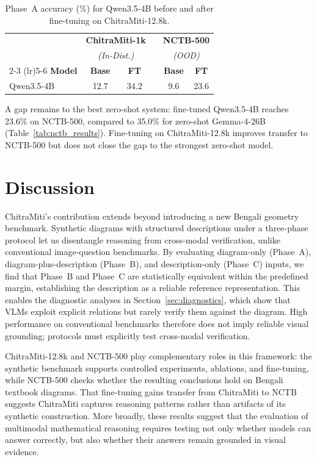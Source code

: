 \documentclass[11pt]{article}
\begin{document}
\begin{table}[t]
\centering
\small
\begin{tabular}{@{}l cc c cc@{}}
\toprule
& \multicolumn{2}{c}{\textbf{ChitraMiti-1k}} & & \multicolumn{2}{c}{\textbf{NCTB-500}} \\
& \multicolumn{2}{c}{\textit{(In-Dist.)}} & & \multicolumn{2}{c}{\textit{(OOD)}} \\
\cmidrule(lr){2-3} \cmidrule(lr){5-6}
\textbf{Model} & \textbf{Base} & \textbf{FT} & & \textbf{Base} & \textbf{FT} \\
\midrule
Qwen3.5-4B & 12.7 & 34.2 & & 9.6 & 23.6 \\
\bottomrule
\end{tabular}
\caption{Phase~A accuracy (\%) for Qwen3.5-4B before and after fine-tuning on ChitraMiti-12.8k.}
\label{tab:finetune}
\end{table}

A gap remains to the best zero-shot system: fine-tuned Qwen3.5-4B reaches 23.6\% on NCTB-500, compared to 35.0\% for zero-shot Gemma-4-26B (Table~\ref{tab:nctb_results}). Fine-tuning on ChitraMiti-12.8k improves transfer to NCTB-500 but does not close the gap to the strongest zero-shot model.

\section{Discussion}
\label{sec:discussion}

ChitraMiti's contribution extends beyond introducing a new Bengali geometry benchmark. Synthetic diagrams with structured descriptions under a three-phase protocol let us disentangle reasoning from cross-modal verification, unlike conventional image-question benchmarks. By evaluating diagram-only (Phase~A), diagram-plus-description (Phase~B), and description-only (Phase~C) inputs, we find that Phase~B and Phase~C are statistically equivalent within the predefined margin, establishing the description as a reliable reference representation. This enables the diagnostic analyses in Section~\ref{sec:diagnostics}, which show that VLMs exploit explicit relations but rarely verify them against the diagram. High performance on conventional benchmarks therefore does not imply reliable visual grounding; protocols must explicitly test cross-modal verification.

ChitraMiti-12.8k and NCTB-500 play complementary roles in this framework: the synthetic benchmark supports controlled experiments, ablations, and fine-tuning, while NCTB-500 checks whether the resulting conclusions hold on Bengali textbook diagrams. That fine-tuning gains transfer from ChitraMiti to NCTB suggests ChitraMiti captures reasoning patterns rather than artifacts of its synthetic construction. More broadly, these results suggest that the evaluation of multimodal mathematical reasoning requires testing not only whether models can answer correctly, but also whether their answers remain grounded in visual evidence.
\end{document}
